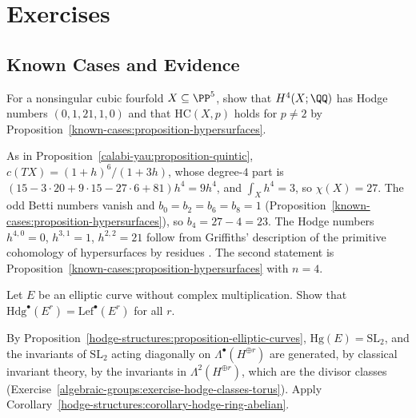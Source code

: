 \section{Exercises}\label{known-cases:section-exercises}

\subsection{Known Cases and Evidence}\label{known-cases:subsection-exercises-known-cases-and-evidence}

\begin{exercise}\label{known-cases:exercise-cubic-fourfold-numbers}
For a nonsingular cubic fourfold $X \subseteq \PP^5$, show that $H^4(X; \QQ)$ has Hodge numbers $(0, 1, 21, 1, 0)$ and that $\mathrm{HC}(X, p)$ holds for $p \neq 2$ by
Proposition~\ref{known-cases:proposition-hypersurfaces}.
\end{exercise}

\begin{solution}
As in Proposition~\ref{calabi-yau:proposition-quintic}, $c(TX) = (1 + h)^6/(1 + 3h)$, whose degree-$4$ part is $(15 - 3 \cdot 20 + 9 \cdot 15 - 27 \cdot 6 + 81)h^4 = 9h^4$, and
$\int_Xh^4 = 3$, so $\chi(X) = 27$. The odd Betti numbers vanish and $b_0 = b_2 = b_6 = b_8 = 1$ (Proposition~\ref{known-cases:proposition-hypersurfaces}), so $b_4 = 27 - 4 = 23$. The Hodge
numbers $h^{4,0} = 0$, $h^{3,1} = 1$, $h^{2,2} = 21$ follow from Griffiths' description of the primitive cohomology of hypersurfaces by residues \cite{voisin-hodge-2}. The second statement is
Proposition~\ref{known-cases:proposition-hypersurfaces} with $n = 4$.
\end{solution}

\begin{exercise}\label{known-cases:exercise-lefschetz-ring-product}
Let $E$ be an elliptic curve without complex multiplication. Show that $\mathrm{Hdg}^\bullet(E^r) = \mathrm{Lef}^\bullet(E^r)$ for all $r$.
\end{exercise}

\begin{solution}
By Proposition~\ref{hodge-structures:proposition-elliptic-curves}, $\mathrm{Hg}(E) = \mathrm{SL}_2$, and the invariants of $\mathrm{SL}_2$ acting diagonally on $\Lambda^\bullet(H^{\oplus r})$ are generated, by classical
invariant theory, by the invariants in $\Lambda^2(H^{\oplus r})$, which are the divisor classes (Exercise~\ref{algebraic-groups:exercise-hodge-classes-torus}). Apply
Corollary~\ref{hodge-structures:corollary-hodge-ring-abelian}.
\end{solution}

